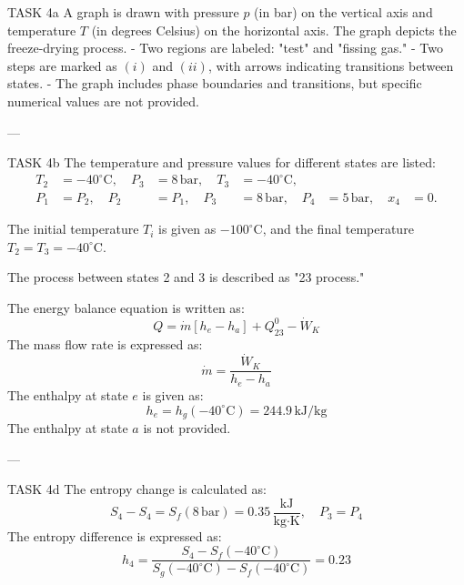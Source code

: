 TASK 4a  
A graph is drawn with pressure \( p \) (in bar) on the vertical axis and temperature \( T \) (in degrees Celsius) on the horizontal axis. The graph depicts the freeze-drying process.  
- Two regions are labeled: "test" and "fissing gas."  
- Two steps are marked as \( (i) \) and \( (ii) \), with arrows indicating transitions between states.  
- The graph includes phase boundaries and transitions, but specific numerical values are not provided.

---

TASK 4b  
The temperature and pressure values for different states are listed:  
\[
\begin{aligned}
T_2 &= -40^\circ\text{C}, \quad P_3 &= 8 \, \text{bar}, \quad T_3 &= -40^\circ\text{C}, \\
P_1 &= P_2, \quad P_2 &= P_1, \quad P_3 &= 8 \, \text{bar}, \quad P_4 &= 5 \, \text{bar}, \quad x_4 &= 0.
\end{aligned}
\]

The initial temperature \( T_i \) is given as \( -100^\circ\text{C} \), and the final temperature \( T_2 = T_3 = -40^\circ\text{C} \).  

The process between states 2 and 3 is described as "23 process."

The energy balance equation is written as:  
\[
Q = \dot{m} \left[ h_e - h_a \right] + Q_{23}^0 - \dot{W}_K
\]  
The mass flow rate is expressed as:  
\[
\dot{m} = \frac{\dot{W}_K}{h_e - h_a}
\]  
The enthalpy at state \( e \) is given as:  
\[
h_e = h_g(-40^\circ\text{C}) = 244.9 \, \text{kJ/kg}
\]  
The enthalpy at state \( a \) is not provided.

---

TASK 4d  
The entropy change is calculated as:  
\[
S_4 - S_4 = S_f(8 \, \text{bar}) = 0.35 \, \frac{\text{kJ}}{\text{kg·K}}, \quad P_3 = P_4
\]  
The entropy difference is expressed as:  
\[
h_4 = \frac{S_4 - S_f(-40^\circ\text{C})}{S_g(-40^\circ\text{C}) - S_f(-40^\circ\text{C})} = 0.23
\]